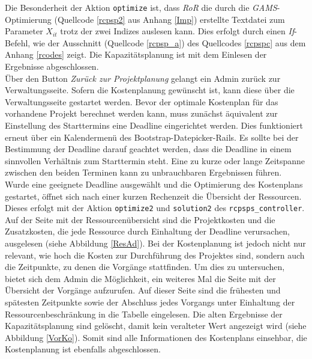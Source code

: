 \documentclass[a4paper,12pt,parskip,bibtotoc,liststotoc]{article}
\begin{document}
Die Besonderheit der Aktion \texttt{optimize} ist, dass \textit{RoR} die durch die \textit{GAMS}-Optimierung (Quellcode \ref{rcpsp2} aus Anhang \ref{Imp}) erstellte Textdatei zum Parameter $X_{it}$ trotz der zwei Indizes auslesen kann. Dies erfolgt durch einen \textit{If}-Befehl, wie der Ausschnitt (Quellcode \ref{rcpsp_a}) des Quellcodes \ref{rcpspc} aus dem Anhang \ref{rcodes} zeigt. Die Kapazitätsplanung ist mit dem Einlesen der Ergebnisse abgeschlossen.\\



Über den Button \textit{Zurück zur Projektplanung} gelangt ein Admin zurück zur Verwaltungsseite. Sofern die Kostenplanung gewünscht ist, kann diese über die Verwaltungsseite gestartet werden. Bevor der optimale Kostenplan für das vorhandene Projekt berechnet werden kann, muss zunächst äquivalent zur Einstellung des Starttermins eine Deadline eingerichtet werden. Dies funktioniert erneut über ein Kalendermenü des \glqq Bootstrap-Datepicker-Rails\grqq. Es sollte bei der Bestimmung der Deadline darauf geachtet werden, dass die Deadline in einem sinnvollen Verhältnis zum Starttermin steht. Eine zu kurze oder lange Zeitspanne zwischen den beiden Terminen kann zu unbrauchbaren Ergebnissen führen. Wurde eine geeignete Deadline ausgewählt und die Optimierung des Kostenplans gestartet, öffnet sich nach einer kurzen Rechenzeit die Übersicht der Ressourcen. Dieses erfolgt mit der Aktion \texttt{optimize2} und \texttt{solution2} des \texttt{rcpsps\_controller}.\\ 

Auf der Seite mit der Ressourcenübersicht sind die Projektkosten und die Zusatzkosten, die jede Ressource durch Einhaltung der Deadline verursachen, ausgelesen (siehe Abbildung \ref{ResAd}). Bei der Kostenplanung ist jedoch nicht nur relevant, wie hoch die Kosten zur Durchführung des Projektes sind, sondern auch die Zeitpunkte, zu denen die Vorgänge stattfinden. Um dies zu untersuchen, bietet sich dem Admin die Möglichkeit, ein weiteres Mal die Seite mit der Übersicht der Vorgänge aufzurufen. Auf dieser Seite sind die frühesten und spätesten Zeitpunkte sowie der Abschluss jedes Vorgangs unter Einhaltung der Ressourcenbeschränkung in die Tabelle eingelesen. Die alten Ergebnisse der Kapazitätsplanung sind gelöscht, damit kein veralteter Wert angezeigt wird (siehe Abbildung \ref{VorKo}). Somit sind alle Informationen des Kostenplans einsehbar, die Kostenplanung ist ebenfalls abgeschlossen.\\  
\end{document}
